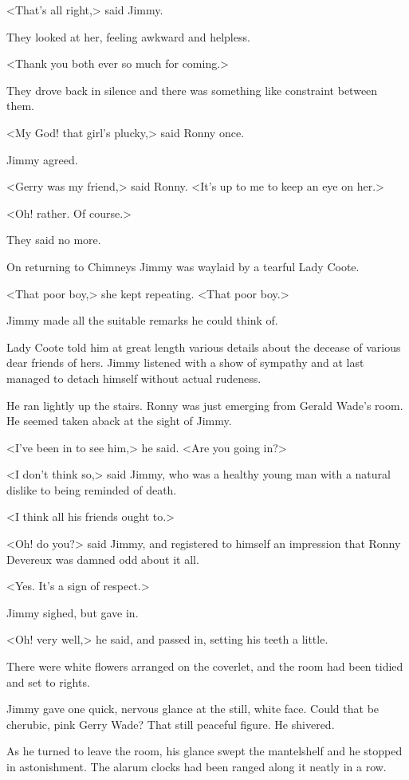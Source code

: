 <That's all right,> said Jimmy.

They looked at her, feeling awkward and helpless.

<Thank you both ever so much for coming.>

They drove back in silence and there was something like constraint between them.

<My God! that girl's plucky,> said Ronny once.

Jimmy agreed.

<Gerry was my friend,> said Ronny. <It's up to me to keep an eye on her.>

<Oh! rather. Of course.>

They said no more.

On returning to Chimneys Jimmy was waylaid by a tearful Lady Coote.

<That poor boy,> she kept repeating. <That poor boy.>

Jimmy made all the suitable remarks he could think of.

Lady Coote told him at great length various details about the decease of various dear friends of hers. Jimmy listened with a show of sympathy and at last managed to detach himself without actual rudeness.

He ran lightly up the stairs. Ronny was just emerging from Gerald Wade's room. He seemed taken aback at the sight of Jimmy.

<I've been in to see him,> he said. <Are you going in?>

<I don't think so,> said Jimmy, who was a healthy young man with a natural dislike to being reminded of death.

<I think all his friends ought to.>

<Oh! do you?> said Jimmy, and registered to himself an impression that Ronny Devereux was damned odd about it all.

<Yes. It's a sign of respect.>

Jimmy sighed, but gave in.

<Oh! very well,> he said, and passed in, setting his teeth a little.

There were white flowers arranged on the coverlet, and the room had been tidied and set to rights.

Jimmy gave one quick, nervous glance at the still, white face. Could that be cherubic, pink Gerry Wade? That still peaceful figure. He shivered.

As he turned to leave the room, his glance swept the mantelshelf and he stopped in astonishment. The alarum clocks had been ranged along it neatly in a row.

